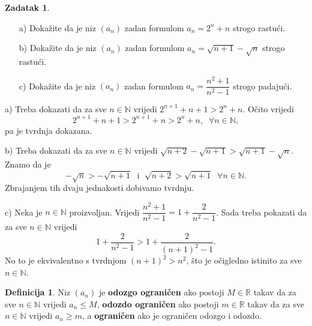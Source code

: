 \documentclass{book}
\renewenvironment{proof}{%
    \vspace{-\parskip}\begin{oldproof}%
    }{%
    \end{oldproof}%
}
\theoremstyle{definition}
\theoremstyle{definition}
\newtheorem{definition}{Definicija}
\newtheorem{exercise}{Zadatak}
\theoremstyle{remark}
\begin{document}
\begin{exercise}\textbf{}
\begin{itemize}
\item[a)] Dokažite da je niz $(a_n)$ zadan formulom $a_n=2^n+n$ strogo rastući.
\item[b)] Dokažite da je niz $(a_n)$ zadan formulom $a_n=\sqrt{n+1}-\sqrt{n}$ strogo rastući.
\item[c)] Dokažite da je niz $(a_n)$ zadan formulom $a_n=\dfrac{n^2+1}{n^2-1}$ strogo padajući.
\end{itemize}
\end{exercise}
\begin{proof}[Rješenje]
a) Treba dokazati da za sve $n\in \mathbb{N}$ vrijedi $2^{n+1}+n+1>2^n+n$. Očito vrijedi $$2^{n+1}+n+1>2^{n+1}+n>2^n+n, \;\;\forall n\in \mathbb{N},$$
pa je tvrdnja dokazana.

b) Treba dokazati da za sve $n\in \mathbb{N}$ vrijedi $\sqrt{n+2}-\sqrt{n+1}>\sqrt{n+1}-\sqrt{n}$. Znamo da je $$-\sqrt{n}>-\sqrt{n+1}\;\text{ i }\;\sqrt{n+2}>\sqrt{n+1}\;\;\forall n\in \mathbb{N}.$$ Zbrajanjem tih dvaju jednakosti dobivamo tvrdnju.

c) Neka je $n\in \mathbb{N}$ proizvoljan. Vrijedi $\dfrac{n^2+1}{n^2-1}=1+\dfrac{2}{n^2-1}$. Sada treba pokazati da za sve $n\in \mathbb{N}$ vrijedi 
$$1+\dfrac{2}{n^2-1}>1+\dfrac{2}{(n+1)^2-1}.$$
No to je ekvivalentno s tvrdnjom $(n+1)^2>n^2$, što je očigledno istinito za sve $n\in \mathbb{N}$.
\end{proof}

\begin{definition}
Niz $(a_n)$ je \textbf{odozgo ograničen} ako postoji $M\in \mathbb{R}$ takav da za sve $n\in \mathbb{N}$ vrijedi $a_n\leq M$, \textbf{odozdo ograničen} ako postoji $m\in \mathbb{R}$ takav da za sve $n\in \mathbb{N}$ vrijedi $a_n\geq m$, a \textbf{ograničen} ako je ograničen odozgo i odozdo.
\end{definition}
\end{document}

